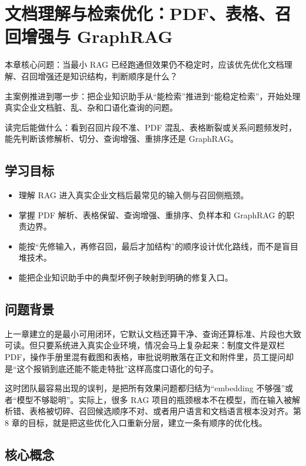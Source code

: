 \chapter{文档理解与检索优化：PDF、表格、召回增强与 GraphRAG}

\begin{introduction}
\item {\heiti 本章核心问题}：当最小 RAG 已经跑通但效果仍不稳定时，应该优先优化文档理解、召回增强还是知识结构，判断顺序是什么？
\item {\heiti 主案例推进到哪一步}：把企业知识助手从“能检索”推进到“能稳定检索”，开始处理真实企业文档脏、乱、杂和口语化查询的问题。
\item {\heiti 读完后能做什么}：看到召回片段不准、PDF 混乱、表格断裂或关系问题频发时，能先判断该修解析、切分、查询增强、重排序还是 GraphRAG。
\end{introduction}

\section{学习目标}
\begin{itemize}
  \item 理解 RAG 进入真实企业文档后最常见的输入侧与召回侧瓶颈。
  \item 掌握 PDF 解析、表格保留、查询增强、重排序、负样本和 GraphRAG 的职责边界。
  \item 能按“先修输入，再修召回，最后才加结构”的顺序设计优化路线，而不是盲目堆技术。
  \item 能把企业知识助手中的典型坏例子映射到明确的修复入口。
\end{itemize}

\section{问题背景}
上一章建立的是最小可用闭环，它默认文档还算干净、查询还算标准、片段也大致可读。但只要系统进入真实企业环境，情况会马上复杂起来：制度文件是双栏 PDF，操作手册里混有截图和表格，审批说明散落在正文和附件里，员工提问却是“这个报销到底还能不能走特批”这样高度口语化的句子。

这时团队最容易出现的误判，是把所有效果问题都归结为“embedding 不够强”或者“模型不够聪明”。实际上，很多 RAG 项目的瓶颈根本不在模型，而在输入被解析错、表格被切碎、召回候选顺序不对、或者用户语言和文档语言根本没对齐。第 8 章的目标，就是把这些优化入口重新分层，建立一条有顺序的优化栈。

\section{核心概念}
